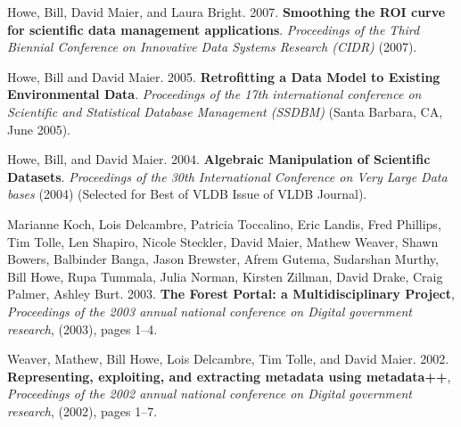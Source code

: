 \begin{bulletlist}
\item Howe, Bill, David Maier, and Laura Bright. 2007. \textbf{Smoothing the ROI
curve for scientific data management applications}. \emph{Proceedings of
the Third Biennial Conference on Innovative Data Systems Research (CIDR)} 
(2007). 

\item Howe, Bill and David Maier. 2005. \textbf{Retrofitting a Data Model to Existing
Environmental Data}. \emph{Proceedings of the 17th international
conference on Scientific and Statistical Database Management (SSDBM)} 
(Santa Barbara, CA, June 2005). 

\item Howe, Bill, and David Maier. 2004.
\textbf{Algebraic Manipulation of Scientific Datasets}. 
\emph{Proceedings of the 30th International Conference on Very Large Data
bases} (2004) (Selected for Best of VLDB Issue of VLDB Journal). 

\item Marianne Koch, Lois Delcambre,
Patricia Toccalino, Eric Landis, Fred Phillips, Tim Tolle,
Len Shapiro, Nicole Steckler, David Maier, Mathew Weaver,
Shawn Bowers, Balbinder Banga,
Jason Brewster, Afrem Gutema, Sudarshan Murthy, Bill Howe, Rupa Tummala,
Julia Norman, Kirsten Zillman,
David Drake, Craig Palmer,
Ashley Burt. 2003. \textbf{The Forest Portal: a Multidisciplinary Project}, 
  \emph{Proceedings of the 2003 annual national conference on Digital government research},
(2003), pages 1--4.

\item Weaver, Mathew, Bill Howe, Lois Delcambre, Tim Tolle, and David Maier. 2002. 
\textbf{Representing, exploiting, and extracting metadata using metadata++},
\emph{Proceedings of the 2002 annual national conference on Digital government research},
(2002), pages 1--7.

\end{bulletlist}


